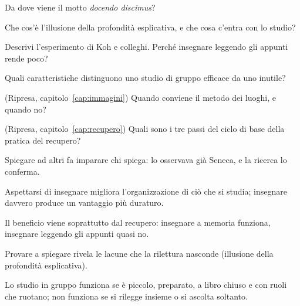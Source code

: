 \begin{domande}
  \item Da dove viene il motto \emph{docendo discimus}?
  \item Che cos'è l'illusione della profondità esplicativa, e che
        cosa c'entra con lo studio?
  \item Descrivi l'esperimento di Koh e colleghi. Perché insegnare
        leggendo gli appunti rende poco?
  \item Quali caratteristiche distinguono uno studio di gruppo
        efficace da uno inutile?
  \item (Ripresa, capitolo~\ref{cap:immagini}) Quando conviene il
        metodo dei luoghi, e quando no?
  \item (Ripresa, capitolo~\ref{cap:recupero}) Quali sono i tre passi
        del ciclo di base della pratica del recupero?
\end{domande}

\begin{sintesi}
  \item Spiegare ad altri fa imparare chi spiega: lo osservava già
        Seneca, e la ricerca lo conferma.
  \item Aspettarsi di insegnare migliora l'organizzazione di ciò che si
        studia; insegnare davvero produce un vantaggio più duraturo.
  \item Il beneficio viene soprattutto dal recupero: insegnare a
        memoria funziona, insegnare leggendo gli appunti quasi no.
  \item Provare a spiegare rivela le lacune che la rilettura nasconde
        (illusione della profondità esplicativa).
  \item Lo studio in gruppo funziona se è piccolo, preparato, a libro
        chiuso e con ruoli che ruotano; non funziona se si rilegge
        insieme o si ascolta soltanto.
\end{sintesi}

\finecapitolo
